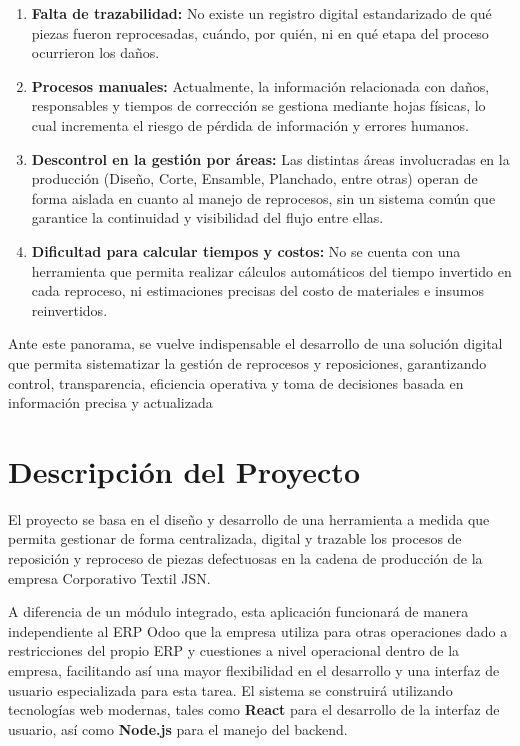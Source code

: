 \documentclass[12pt,letterpaper,spanish]{report}
\begin{document}
\begin{enumerate}
    \item \textbf{Falta de trazabilidad:} No existe un registro digital estandarizado de qué piezas fueron reprocesadas, cuándo, por quién, ni en qué etapa del proceso ocurrieron los daños.
    
    \item \textbf{Procesos manuales:} Actualmente, la información relacionada con daños, responsables y tiempos de corrección se gestiona mediante hojas físicas, lo cual incrementa el riesgo de pérdida de información y errores humanos.
    
    \item \textbf{Descontrol en la gestión por áreas:} Las distintas áreas involucradas en la producción (Diseño, Corte, Ensamble, Planchado, entre otras) operan de forma aislada en cuanto al manejo de reprocesos, sin un sistema común que garantice la continuidad y visibilidad del flujo entre ellas.
    
    \item \textbf{Dificultad para calcular tiempos y costos:} No se cuenta con una herramienta que permita realizar cálculos automáticos del tiempo invertido en cada reproceso, ni estimaciones precisas del costo de materiales e insumos reinvertidos.

\end{enumerate}

Ante este panorama, se vuelve indispensable el desarrollo de una solución digital que permita sistematizar la gestión de reprocesos y reposiciones, garantizando control, transparencia, eficiencia operativa y toma de decisiones basada en información precisa y actualizada



\section{Descripción del Proyecto}

El proyecto se basa en el diseño y desarrollo de una herramienta a medida que permita gestionar de forma centralizada, digital y trazable los procesos de reposición y reproceso de piezas defectuosas en la cadena de producción de la empresa Corporativo Textil JSN.

A diferencia de un módulo integrado, esta aplicación funcionará de manera independiente al ERP Odoo que la empresa utiliza para otras operaciones dado a restricciones del propio ERP y cuestiones a nivel operacional dentro de la empresa, facilitando así una mayor flexibilidad en el desarrollo y una interfaz de usuario especializada para esta tarea. El sistema se construirá utilizando tecnologías web modernas, tales como \textbf{React} para el desarrollo de la interfaz de usuario, así como \textbf{Node.js} para el manejo del backend.
\end{document}
